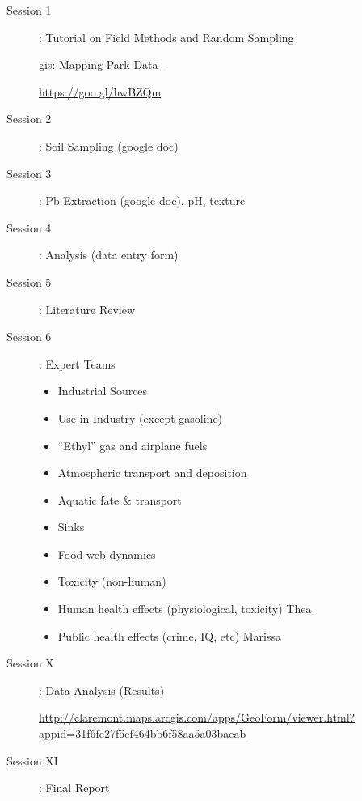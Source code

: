 \documentclass{article}\usepackage[]{graphicx}\usepackage[]{color}
\begin{document}
\begin{description}

\item[Session 1]: Tutorial on Field Methods and Random Sampling


gis: Mapping Park Data -- 

\url{https://goo.gl/hwBZQm}

\item[Session 2]: Soil Sampling (google doc)

\item[Session 3]: Pb Extraction (google doc), pH, texture

\item[Session 4]: Analysis (data entry form)

\item[Session 5]: Literature Review

\item[Session 6]: Expert Teams


\begin{itemize}


  \item Industrial Sources
  \item Use in Industry (except gasoline) 
  \item ``Ethyl'' gas and airplane fuels 
  \item Atmospheric transport and deposition
  \item Aquatic fate \& transport 
  \item Sinks 
  \item Food web dynamics 
  \item Toxicity (non-human) 
  \item Human health effects (physiological, toxicity) Thea
  \item Public health effects (crime, IQ, etc) Marissa
\end{itemize}

  \item[Session X]: Data Analysis (Results)

\url{http://claremont.maps.arcgis.com/apps/GeoForm/viewer.html?appid=31f6fe27f5ef464bb6f58aa5a03baeab}

\item[Session XI]: Final Report

\end{description}
\end{document}
